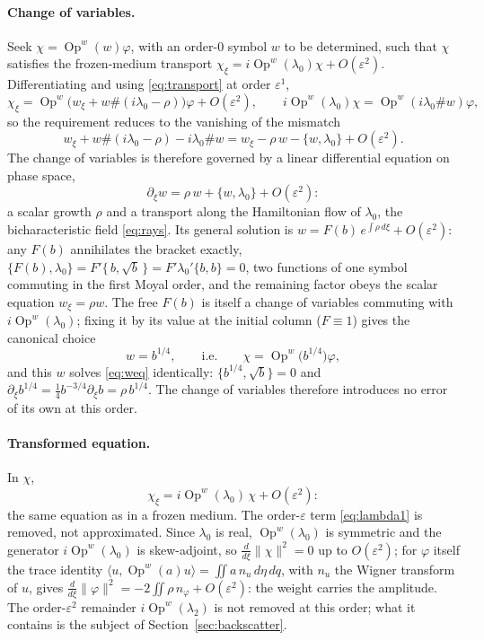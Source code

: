 \documentclass[11pt]{article}
\newcommand{\pd}{\partial}
\newcommand{\Op}{\operatorname{Op}^w}
\begin{document}
\paragraph{Change of variables.} Seek $\chi=\Op(w)\varphi$, with an
order-$0$ symbol $w$ to be determined, such that $\chi$ satisfies the
frozen-medium transport
$\chi_\xi=i\Op(\lambda_0)\chi+O(\varepsilon^2)$. Differentiating and using
\eqref{eq:transport} at order $\varepsilon^1$,
\[
\chi_\xi=\Op\bigl(w_\xi+w\#(i\lambda_0-\rho)\bigr)\varphi
+O(\varepsilon^2),\qquad
i\Op(\lambda_0)\chi=\Op(i\lambda_0\#w)\varphi,
\]
so the requirement reduces to the vanishing of the mismatch
\[
w_\xi+w\#(i\lambda_0-\rho)-i\lambda_0\#w
=w_\xi-\rho\,w-\{w,\lambda_0\}+O(\varepsilon^2).
\]
The change of variables is therefore governed by a linear differential
equation on phase space,
\begin{equation}\label{eq:weq}
\pd_\xi w=\rho\,w+\{w,\lambda_0\}+O(\varepsilon^2):
\end{equation}
a scalar growth $\rho$ and a transport along the Hamiltonian flow of
$\lambda_0$, the bicharacteristic field \eqref{eq:rays}. Its general
solution is $w=F(b)\,e^{\int\rho\,d\xi}+O(\varepsilon^2)$: any $F(b)$
annihilates the bracket exactly, $\{F(b),\lambda_0\}=F'\{\,b,\sqrt b\,\}
=F'\lambda_0'\{b,b\}=0$, two functions of one symbol commuting in the first
Moyal order, and the remaining factor obeys the scalar equation
$w_\xi=\rho w$. The free $F(b)$ is itself a change of variables commuting
with $i\Op(\lambda_0)$; fixing it by its value at the initial column
($F\equiv1$) gives the canonical choice
\[
w=b^{1/4},\qquad\text{i.e.}\qquad \chi=\Op\bigl(b^{1/4}\bigr)\varphi ,
\]
and this $w$ solves \eqref{eq:weq} identically:
$\{b^{1/4},\sqrt b\}=0$ and
$\pd_\xi b^{1/4}=\tfrac14b^{-3/4}\pd_\xi b=\rho\,b^{1/4}$. The change of
variables therefore introduces no error of its own at this order.

\paragraph{Transformed equation.} In $\chi$,
\[
\chi_\xi=i\Op(\lambda_0)\,\chi+O(\varepsilon^2):
\]
the same equation as in a frozen medium. The order-$\varepsilon$ term
\eqref{eq:lambda1} is removed, not approximated. Since $\lambda_0$ is real,
$\Op(\lambda_0)$ is symmetric and the generator $i\Op(\lambda_0)$ is
skew-adjoint, so $\tfrac d{d\xi}\|\chi\|^2=0$ up to $O(\varepsilon^2)$; for
$\varphi$ itself the trace identity
$\langle u,\Op(a)u\rangle=\iint a\,n_u\,d\eta\,dq$, with $n_u$ the Wigner
transform of $u$, gives
$\tfrac d{d\xi}\|\varphi\|^2=-2\iint\rho\,n_\varphi+O(\varepsilon^2)$:
the weight carries the amplitude. The order-$\varepsilon^2$ remainder
$i\Op(\lambda_2)$ is not removed at this order; what it contains is the
subject of Section~\ref{sec:backscatter}.
\end{document}
